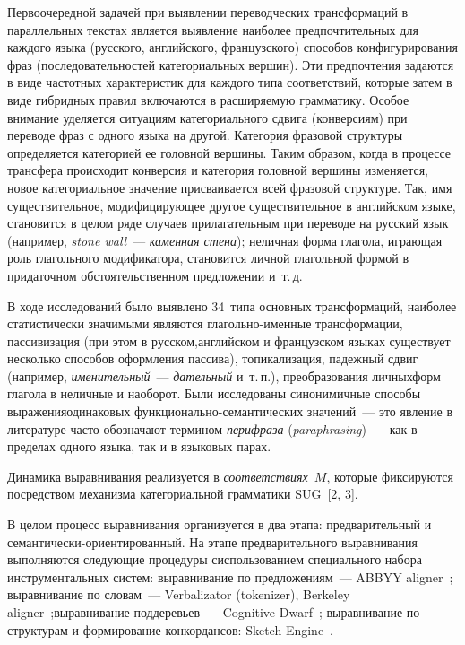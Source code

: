 \begin{multicols}{2}
   Первоочередной задачей при выявлении переводческих трансформаций в
параллельных текстах является выявление наиболее предпочтительных для
каждого языка (русского, английского, французского) способов
конфигурирования фраз (последовательностей категориальных вершин). Эти
предпочтения задаются в виде частотных характеристик для каждого типа
соответствий, которые затем в виде гибридных правил включаются в
расширяемую грамматику. Особое внимание уделяется ситуациям
категориального сдвига (конверсиям) при переводе фраз с одного языка на другой.
Категория фразовой структуры определяется категорией ее головной вершины.
Таким образом, когда в процессе трансфера происходит конверсия и категория
головной вершины изменяется, новое категориальное значение присваивается
всей фразовой структуре. Так, имя существительное, модифицирующее другое
существительное в английском языке, становится в целом ряде случаев
прилагательным при переводе на русский язык (например, \textit{stone wall}~---
\textit{каменная стена}); неличная форма глагола, игра\-ющая роль глагольного
модификатора, становится личной глагольной формой в придаточном
обстоятельственном предложении и~т.\,д.

   В ходе исследований было выявлено 34~типа основных трансформаций,
наиболее статистически значимыми являются гла\-голь\-но-имен\-ные трансформации,
пассивизация (при этом в русском,\linebreak английском и французском языках существует
несколько способов оформления пассива), топикализация, падежный сдвиг
(например, \textit{именительный}~--- \textit{дательный} и~т.\,п.), преобразования
личных\linebreak форм глагола в неличные и наоборот. Были ис\-следованы синонимичные
способы выражения\linebreak одинаковых функционально-семантических значений~--- это
явление в литературе часто обозначают термином \textit{перифраза}
(\textit{paraphrasing})~--- как в пределах одного языка, так и в языковых парах.

   Динамика выравнивания реализуется в \textit{соответствиях}~$M$, которые
фиксируются посредством механизма категориальной грамматики SUG~[2, 3].

   В целом процесс выравнивания организуется в два этапа: предварительный и
семантически-ори\-ен\-ти\-ро\-ван\-ный. На этапе предварительного выравнивания
выполняются следующие процедуры с\linebreak использованием специального набора
инструментальных систем: выравнивание по предложениям~--- ABBYY
aligner~\cite{4-koz}; выравнивание по словам~--- Verbalizator (tokenizer), Berkeley
aligner~\cite{5-koz};\linebreak выравнивание поддеревьев~--- Cognitive Dwarf~\cite{6-koz};
выравнивание по структурам и формирование конкордансов: Sketch
Engine~\cite{7-koz}.


\end{multicols}
